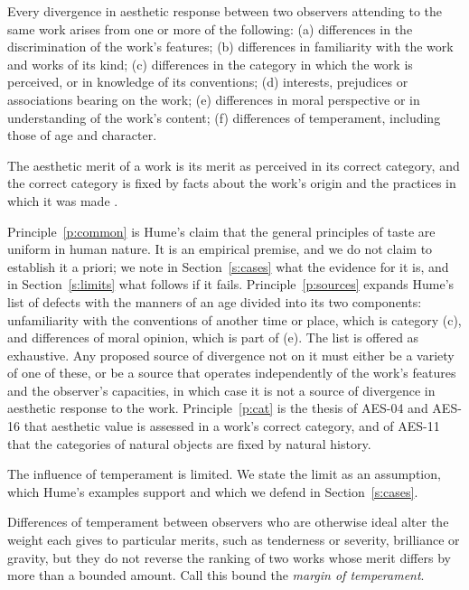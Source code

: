 \documentclass{situationist-preprint}
\begin{document}
\begin{principle}\label{p:sources}
Every divergence in aesthetic response between two observers attending to the same work arises from one or more of the following: (a) differences in the discrimination of the work's features; (b) differences in familiarity with the work and works of its kind; (c) differences in the category in which the work is perceived, or in knowledge of its conventions; (d) interests, prejudices or associations bearing on the work; (e) differences in moral perspective or in understanding of the work's content; (f) differences of temperament, including those of age and character.
\end{principle}

\begin{principle}[Categories]\label{p:cat}
The aesthetic merit of a work is its merit as perceived in its correct category, and the correct category is fixed by facts about the work's origin and the practices in which it was made \citep{Walton1970}.
\end{principle}

Principle~\ref{p:common} is Hume's claim that the general principles of taste are uniform in human nature. It is an empirical premise, and we do not claim to establish it a priori; we note in Section~\ref{s:cases} what the evidence for it is, and in Section~\ref{s:limits} what follows if it fails. Principle~\ref{p:sources} expands Hume's list of defects with the manners of an age divided into its two components: unfamiliarity with the conventions of another time or place, which is category (c), and differences of moral opinion, which is part of (e). The list is offered as exhaustive. Any proposed source of divergence not on it must either be a variety of one of these, or be a source that operates independently of the work's features and the observer's capacities, in which case it is not a source of divergence in aesthetic response to the work. Principle~\ref{p:cat} is the thesis of AES-04 and AES-16 that aesthetic value is assessed in a work's correct category, and of AES-11 that the categories of natural objects are fixed by natural history.

The influence of temperament is limited. We state the limit as an assumption, which Hume's examples support and which we defend in Section~\ref{s:cases}.

\begin{assumption}\label{a:temp}
Differences of temperament between observers who are otherwise ideal alter the weight each gives to particular merits, such as tenderness or severity, brilliance or gravity, but they do not reverse the ranking of two works whose merit differs by more than a bounded amount. Call this bound the \emph{margin of temperament}.
\end{assumption}
\end{document}
